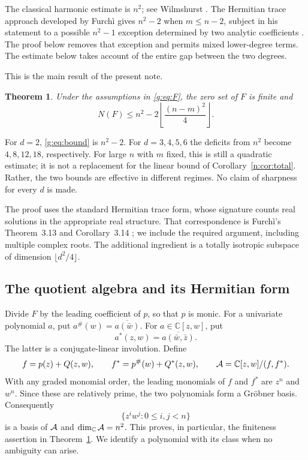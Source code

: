 \documentclass[UTF8,11pt]{ctexart}
\newtheorem{thm}{Theorem}[section]
\theoremstyle{definition}
\numberwithin{equation}{section}
\newcommand{\C}{\mathbb C}\newcommand{\R}{\mathbb R}
\begin{document}
The classical harmonic estimate is $n^2$; see Wilmshurst
\cite[pp.~2077--2079]{Wil98}. The Hermitian trace approach developed by
Furch\`i gives $n^2-2$ when $m\le n-2$, subject in his statement to a possible
$n^2-1$ exception determined by two analytic coefficients
\cite[Theorem~1.1, author version v2, p.~2]{Fur25}.
The proof below removes that exception and permits mixed lower-degree terms. The estimate below takes account of
the entire gap between the two degrees.

This is the main result of the present note.
\begin{thm}\label{g:thm:main}
Under the assumptions in \eqref{g:eq:F}, the zero set of $F$ is finite and
\begin{equation}\label{g:eq:bound}
 N(F)\le n^2-2\left\lfloor\frac{(n-m)^2}{4}\right\rfloor.
\end{equation}
\end{thm}

For $d=2$, \eqref{g:eq:bound} is $n^2-2$. For $d=3,4,5,6$ the deficits from
$n^2$ become $4,8,12,18$, respectively. For large $n$ with $m$ fixed, this is
still a quadratic estimate; it is not a replacement for the linear bound
of Corollary~\ref{n:cor:total}. Rather, the two bounds are effective in different regimes.
No claim of sharpness for every $d$ is made.

The proof uses the standard Hermitian trace form, whose signature counts
real solutions in the appropriate real structure. That correspondence is
Furch\`i's Theorem~3.13 and Corollary~3.14
\cite[author version v2, pp.~9--10]{Fur25}; we include the required argument,
including multiple complex roots. The additional ingredient is a totally
isotropic subspace of dimension $\lfloor d^2/4\rfloor$. 
\subsection{The quotient algebra and its Hermitian form}
Divide $F$ by the leading coefficient of $p$, so that $p$ is monic.
For a univariate polynomial $a$, put
$a^\#(w)=\overline{a(\bar w)}$. For $a\in\C[z,w]$, put
\[
 a^*(z,w)=\overline{a(\bar w,\bar z)}.
\]
The latter is a conjugate-linear involution. Define
\begin{equation}\label{g:eq:algebra}
 f=p(z)+Q(z,w),\qquad
 f^*=p^\#(w)+Q^*(z,w),\qquad
 \A=\C[z,w]/(f,f^*).
\end{equation}
With any graded monomial order, the leading monomials of $f$ and $f^*$ are
$z^n$ and $w^n$. Since these are relatively prime, the two polynomials form
a Gr\"obner basis. Consequently
\begin{equation}\label{g:eq:basis}
 \{z^i w^j:0\le i,j<n\}
\end{equation}
is a basis of $\mathcal A$ and $\dim_\C\A=n^2$. This proves, in particular, the
finiteness assertion in Theorem~\ref{g:thm:main}. We identify a polynomial
with its class when no ambiguity can arise.
\end{document}
